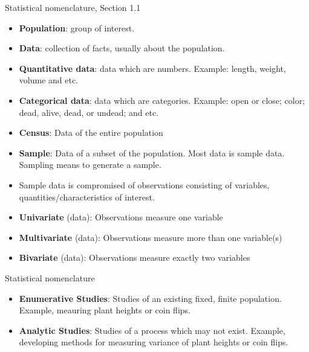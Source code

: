 \documentclass{beamer}
\begin{document}
\begin{frame}{Statistical nomenclature, Section 1.1}
    \begin{itemize}
        \item {\bf Population}: group of interest.
        \item {\bf Data}: collection of facts, usually about the population.
        \item {\bf Quantitative data}: data which are numbers. Example: length, weight, volume and etc.
        \item {\bf Categorical data}: data which are categories. Example: open or close; color; dead, alive, dead, or undead; and etc.
        \item {\bf Census}: Data of the entire population
        \item {\bf Sample}: Data of a subset of the population. Most data is sample data. Sampling means to generate a sample.
        \item Sample data is compromised of observations consisting of variables, quantities/characteristics of interest.
        \item {\bf Univariate} (data): Observations measure one variable
        \item {\bf Multivariate} (data): Observations measure more than one variable(s)
        \item {\bf Bivariate} (data): Observations measure exactly two variables
    \end{itemize}
\end{frame}

\begin{frame}{Statistical nomenclature}
    \begin{itemize}
        \item {\bf Enumerative Studies}: Studies of an existing fixed, finite population. Example, meauring plant heights or coin flips.
        \item {\bf Analytic Studies}: Studies of a process which may not exist. Example, developing methods for measuring variance of plant heights or coin flips.
    \end{itemize}
\end{frame}
\end{document}
